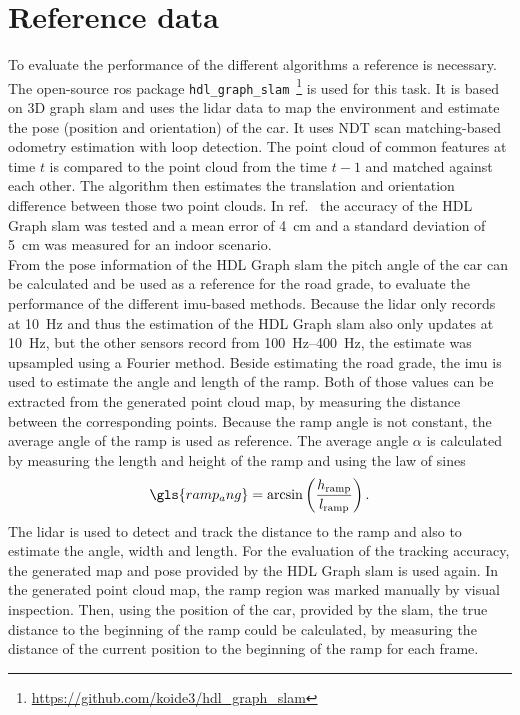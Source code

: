 \section{Reference data}
To evaluate the performance of the different algorithms a reference is necessary.
The open-source \gls{ros} package \texttt{hdl\_graph\_slam}~\footnote{\url{https://github.com/koide3/hdl_graph_slam}} is used for this task.
It is based on 3D graph \gls{slam} and uses the \gls{lidar} data to map the environment and estimate the pose (position and orientation) of the car.
It uses NDT scan matching-based odometry estimation with loop detection.
The point cloud of common features at time $t$ is compared to the point cloud from the time $t-1$ and matched against each other.
The algorithm then estimates the translation and orientation difference between those two point clouds.
In ref.~\cite{Akpnar2021} the accuracy of the HDL Graph \gls{slam} was tested and a mean error of \SI{4}{\cm} and a standard deviation of \SI{5}{\cm} was measured for an indoor scenario.\\
From the pose information of the HDL Graph \gls{slam} the pitch angle of the car can be calculated and be used as a reference for the road grade, to evaluate the performance of the different \gls{imu}-based methods.
Because the \gls{lidar} only records at \SI{10}{\hertz} and thus the estimation of the HDL Graph \gls{slam} also only updates at \SI{10}{\hertz}, but the other sensors record from \SIrange{100}{400}{\hertz}, the estimate was upsampled using a Fourier method.
Beside estimating the road grade, the \gls{imu} is used to estimate the angle and length of the ramp.
Both of those values can be extracted from the generated point cloud map, by measuring the distance between the corresponding points.
Because the ramp angle is not constant, the average angle of the ramp is used as reference.
The average angle $\alpha$ is calculated by measuring the length and height of the ramp and using the law of sines
\begin{equation}
	\gls{ramp_ang} = \arcsin\left(\frac{h_\mathrm{ramp}}{l_\mathrm{ramp}}\right).
\end{equation}
The \gls{lidar} is used to detect and track the distance to the ramp and also to estimate the angle, width and length.
For the evaluation of the tracking accuracy, the generated map and pose provided by the HDL Graph \gls{slam} is used again.
In the generated point cloud map, the ramp region was marked manually by visual inspection.
Then, using the position of the car, provided by the \gls{slam}, the true distance to the beginning of the ramp could be calculated, by measuring the distance of the current position to the beginning of the ramp for each frame.\\
